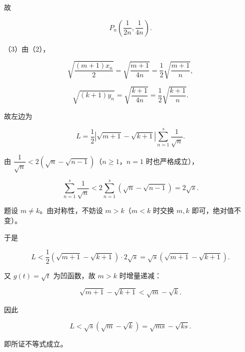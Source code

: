 \begin{answer}
故

\nopagebreak[4]
\[P_n\left(\frac1{2n},\frac1{4n}\right).\]

（3）由（2），

\nopagebreak[4]
\[\sqrt{\frac{(m+1)x_n}{2}}
=\sqrt{\frac{m+1}{4n}}=\frac12\sqrt{\frac{m+1}{n}},\]

\nopagebreak[4]
\[\sqrt{(k+1)y_n}
=\sqrt{\frac{k+1}{4n}}=\frac12\sqrt{\frac{k+1}{n}}.\]

故左边为

\nopagebreak[4]
\[L=\frac12\left|\sqrt{m+1}-\sqrt{k+1}\right|\sum_{n=1}^s\frac1{\sqrt n}.\]

由 $\dfrac1{\sqrt n}<2(\sqrt n-\sqrt{n-1})$（$n\geqslant1$，$n=1$ 时也严格成立），

\nopagebreak[4]
\[\sum_{n=1}^s\frac1{\sqrt n}
<2\sum_{n=1}^s(\sqrt n-\sqrt{n-1})=2\sqrt s.\]

题设 $m\neq k$。由对称性，不妨设 $m>k$（$m<k$ 时交换 $m,k$ 即可，绝对值不变）。

于是

\nopagebreak[4]
\[L<\frac12\left(\sqrt{m+1}-\sqrt{k+1}\right)\cdot2\sqrt s
=\sqrt s\left(\sqrt{m+1}-\sqrt{k+1}\right).\]

又 $g(t)=\sqrt t$ 为凹函数，故 $m>k$ 时增量递减：

\nopagebreak[4]
\[\sqrt{m+1}-\sqrt{k+1}<\sqrt m-\sqrt k.\]

因此

\nopagebreak[4]
\[L<\sqrt s(\sqrt m-\sqrt k)=\sqrt{ms}-\sqrt{ks}.\]

即所证不等式成立。


\end{answer}